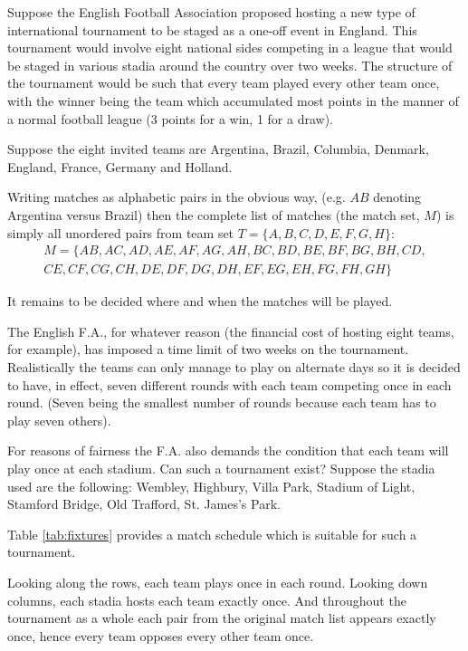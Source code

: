 Suppose the English Football Association proposed hosting a new type of international tournament to be staged as a one-off event in England.
This tournament would involve eight national sides competing in a league that would be staged in various stadia around the country over two weeks.
The structure of the tournament would be such that every team played every other team once, with the winner being the team which accumulated most points in the manner of a normal football league (3 points for a win, 1 for a draw).

\begin{example}
Suppose the eight invited teams are Argentina, Brazil, Columbia, Denmark, England, France, Germany and Holland.

Writing matches as alphabetic pairs in the obvious way, (e.g. $AB$ denoting Argentina versus Brazil) then the complete list of matches (the match set, $M$) is simply all unordered pairs from team set $T = \{A, B, C, D, E, F, G, H\}$:
\begin{equation*}
  \begin{split}
    M = \{
      AB, AC, AD, AE, AF, AG, AH, BC, BD, BE, BF, BG, BH, CD, \\
      CE, CF, CG, CH, DE, DF, DG, DH, EF, EG, EH, FG, FH, GH
    \}
  \end{split}
\end{equation*}

It remains to be decided where and when the matches will be played.

The English F.A., for whatever reason (the financial cost of hosting eight teams, for example), has imposed a time limit of two weeks on the tournament.
Realistically the teams can only manage to play on alternate days so it is decided to have, in effect, seven different rounds with each team competing once in each round.
(Seven being the smallest number of rounds because each team has to play seven others).

For reasons of fairness the F.A. also demands the condition that each team will play once at each stadium.
Can such a tournament exist?
Suppose the stadia used are the following: Wembley, Highbury, Villa Park, Stadium of Light, Stamford Bridge, Old Trafford, St. James's Park.

Table \ref{tab:fixtures} provides a match schedule which is suitable for such a tournament.

Looking along the rows, each team plays once in each round.
Looking down columns, each stadia hosts each team exactly once.
And throughout the tournament as a whole each pair from the original match list appears exactly once, hence every team opposes every other team once.
\label{eg:football}
\end{example}

